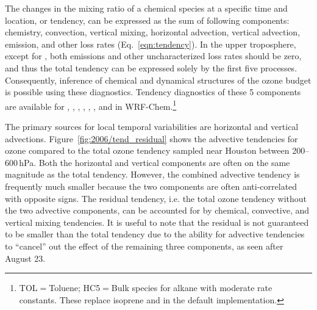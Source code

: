 The changes in the mixing ratio of a chemical species at a specific time and location, or tendency, can be expressed as
the sum of following components: chemistry, convection, vertical mixing, horizontal advection, vertical advection, emission,
and other loss rates (Eq.~\ref{eqn:tendency}). In the upper troposphere, except for , both emissions and other
uncharacterized loss rates should be zero, and thus the total tendency can be expressed solely by the first five processes.
Consequently, inference of chemical and dynamical structures of the ozone budget is possible using these diagnostics.
Tendency diagnostics of these 5 components are available for , , , , 
, , and  in WRF-Chem.\footnote{TOL$=$Toluene; HC5$=$Bulk species for alkane with moderate 
rate constants. These replace isoprene and  in the default implementation.}


The primary sources for local temporal variabilities are horizontal and vertical advections. Figure~\ref{fig:2006/tend_residual} shows
the advective tendencies for ozone compared to the total ozone tendency sampled near Houston between 200--600\,\unit{hPa}.
Both the horizontal and vertical components are often on the same magnitude as the total tendency. However, the combined
advective tendency is frequently much smaller because the two components are often anti-correlated with opposite signs. The residual
tendency, i.e. the total ozone tendency without the two advective components, can be accounted for by chemical, convective, and
vertical mixing tendencies. It is useful to note that the residual is not guaranteed to be smaller than the total tendency due to the ability for advective tendencies
to ``cancel'' out the effect of the remaining three components, as seen after August 23.

